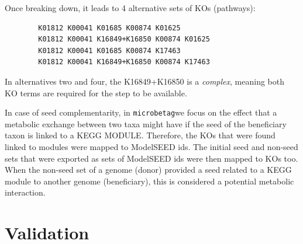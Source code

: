 \documentclass[sn-mathphys,Numbered]{sn-jnl}  %
\theoremstyle{thmstyleone}%
\theoremstyle{thmstyletwo}%
\theoremstyle{thmstylethree}%
\newcommand{\microbetag}{\texttt{microbetag}}
\begin{document}
\begin{appendices}
        Once breaking down, it leads to 4 alternative sets of KOs (pathways):

        \bigskip
        \begin{verbatim}
        K01812 K00041 K01685 K00874 K01625
        K01812 K00041 K16849+K16850 K00874 K01625
        K01812 K00041 K01685 K00874 K17463
        K01812 K00041 K16849+K16850 K00874 K17463
        \end{verbatim}
        \bigskip


        In alternatives two and four, the K16849+K16850 is a \textit{complex}, meaning both KO terms are required for the step to be available.


        In case of seed complementarity, in \microbetag we focus on the effect that a metabolic exchange between two taxa might have if the seed of the beneficiary taxon is linked to a KEGG MODULE.
        Therefore, the KOs that were found linked to modules were mapped to ModelSEED ids. 
        The initial seed and non-seed sets that were exported as sets of ModelSEED ids were then mapped to KOs too.
        When the non-seed set of a genome (donor) provided a seed related to a KEGG module to another genome (beneficiary), this is considered a potential metabolic interaction.



    \section{Validation}
    \label{app:val}


\end{appendices}
\end{document}
